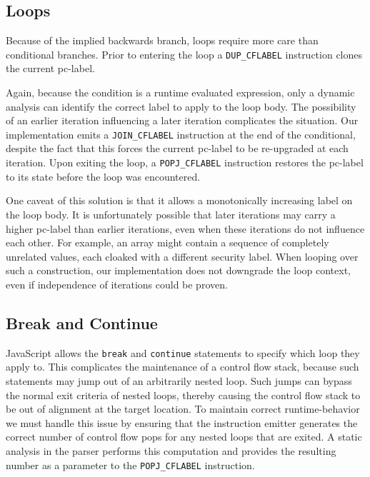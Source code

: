 \documentclass[preprint]{sigplanconf}
\begin{document}
\subsection{Loops}

Because of the implied backwards branch, loops require more care than conditional branches.
Prior to entering the loop a \texttt{DUP\_CFLABEL} instruction clones the current pc-label.

Again, because the condition is a runtime evaluated expression, only a dynamic analysis can identify the correct label to apply to the loop body.
The possibility of an earlier iteration influencing a later iteration complicates the situation.
Our implementation emits a \texttt{JOIN\_CFLABEL} instruction at the end of the conditional, despite the fact that this forces the current pc-label to be re-upgraded at each iteration.
Upon exiting the loop, a \texttt{POPJ\_CFLABEL} instruction restores the pc-label to its state before the loop was encountered.

One caveat of this solution is that it allows a monotonically increasing label on the loop body.
It is unfortunately possible that later iterations may carry a higher pc-label than earlier iterations, even when these iterations do not influence each other.
For example, an array might contain a sequence of completely unrelated values, each cloaked with a different security label.
When looping over such a construction, our implementation does not downgrade the loop context, even if independence of iterations could be proven.

\subsection{Break and Continue}
\label{sec:break-and-continue}
JavaScript allows the \texttt{break} and \texttt{continue} statements to specify which loop they apply to.
This complicates the maintenance of a control flow stack, because such statements may jump out of an arbitrarily nested loop.
Such jumps can bypass the normal exit criteria of nested loops, thereby causing the control flow stack to be out of alignment at the target location.
To maintain correct runtime-behavior we must handle this issue by ensuring that the instruction emitter generates the correct number of control flow pops for any nested loops that are exited.
A static analysis in the parser performs this computation and provides the resulting number as a parameter to the \texttt{POPJ\_CFLABEL} instruction.
\end{document}

